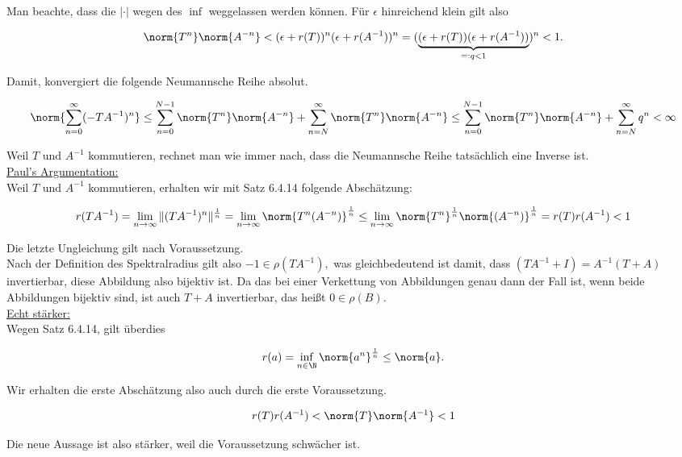 \begin{solution}
Man beachte, dass die $|\cdot|$ wegen des $\inf$ weggelassen werden können.
Für $\epsilon$ hinreichend klein gilt also

\begin{align*}
  \norm{T^n} \norm{A^{-n}}
  <
  (\epsilon + r(T))^n
  (\epsilon + r(A^{-1}))^n
  =
  (
    \underbrace
    {
      (\epsilon + r(T))
      (\epsilon + r(A^{-1}))
    }_{=: q < 1}
  )^n < 1.
\end{align*}

Damit, konvergiert die folgende Neumannsche Reihe absolut.

\begin{align*}
  \norm{\sum_{n = 0}^\infty (-T A^{-1})^n}
  \leq
  \sum_{n = 0}^{N-1} \norm{T^n} \norm{A^{-n}} +
  \sum_{n = N}^\infty \norm{T^n} \norm{A^{-n}}
  \leq
  \sum_{n = 0}^{N-1} \norm{T^n} \norm{A^{-n}} +
  \sum_{n = N}^\infty q^n
  < \infty
\end{align*}

Weil $T$ und $A^{-1}$ kommutieren, rechnet man wie immer nach, dass die Neumannsche Reihe tatsächlich eine Inverse ist. \\

\underline{Paul's Argumentation:} \\

Weil $T$ und $A^{-1}$ kommutieren, erhalten wir mit Satz 6.4.14 folgende Abschätzung:

\begin{align*}
    r(TA^{-1})
    =
    \lim_{n \to \infty}{\|(TA^{-1})^n\|^{\frac{1}{n}}}
    =
    \lim_{n \to \infty}
    \norm{T^n(A^{-n})}^\frac{1}{n}
    \leq
    \lim_{n \to \infty}
    \norm{T^n}^\frac{1}{n}
    \norm{(A^{-n})}^\frac{1}{n}
    =
    r(T) r(A^{-1}) < 1
\end{align*}

Die letzte Ungleichung gilt nach Voraussetzung. \\

Nach der Definition des Spektralradius gilt also $-1 \in \rho(TA^{-1}),$ was gleichbedeutend ist damit, dass $(TA^{-1} + I) = A^{-1} (T + A)$ invertierbar, diese Abbildung also bijektiv ist. Da das bei einer Verkettung von Abbildungen genau dann der Fall ist, wenn beide Abbildungen bijektiv sind, ist auch $T + A$ invertierbar, das heißt $0 \in \rho(B).$ \\

\underline{Echt stärker:} \\

Wegen Satz 6.4.14, gilt überdies

\begin{align*}
  r(a)
  =
  \inf_{n \in \N}
  \norm{a^n}^\frac{1}{n}
  \leq
  \norm{a}.
\end{align*}

Wir erhalten die erste Abschätzung also auch durch die erste Voraussetzung.

\begin{align*}
  r(T) r(A^{-1})
  <
  \norm{T} \norm{A^{-1}} < 1
\end{align*}

Die neue Aussage ist also stärker, weil die Voraussetzung schwächer ist.

\end{solution}
